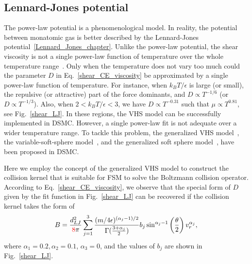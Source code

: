 \subsection{Lennard-Jones potential}



The power-law potential is a phenomenological model. In reality, the potential between monatomic gas is better described by the Lennard-Jones potential~\eqref{Lennard_Jones_chapter}. 
Unlike the power-law potential, the shear viscosity is not a single power-law function of temperature over the whole temperature range~\cite{CE}. Only when the temperature does not vary too much could the parameter $D$ in Eq.~\eqref{shear_CE_viscosity} be approximated by a single power-law function of temperature. For instance, when $k_BT/\epsilon$ is large (or small), the repulsive (or attractive) part of the force dominants, and $D\propto{T}^{-1/6}$ (or $D\propto{T}^{-1/3}$). Also, when $2<k_BT/\epsilon<3$, we have $D\propto{T}^{-0.31}$ such that $\mu\propto{T}^{0.81}$, see Fig.~\ref{shear_LJ}. In these regions, the VHS model can be successfully implemented in DSMC. However, a single power-law fit is not adequate over a wider temperature range. To tackle this problem, the generalized VHS model~\cite{Hassan1993}, the variable-soft-sphere model~\cite{Matsumoto2002}, and the generalized soft sphere model~\cite{Fan2002}, have been proposed in DSMC.

Here we employ the concept of the generalized VHS model to construct the collision kernel that is suitable for FSM to solve the Boltzmann collision operator. According to Eq.~\eqref{shear_CE_viscosity}, we observe that the special form of $D$ given by the fit function in Fig.~\ref{shear_LJ} can be recovered if the collision kernel takes the form of
\begin{equation}\label{kernel_spectral}
B=\frac{d_{LJ}^2}{\leir{8}\pi}\sum_{j=1}^3 \frac{({m}/{4\epsilon})^{(\alpha_j-1)/2}}{\Gamma(\frac{3+\alpha_j}{2})}b_j
\sin^{\alpha_j-1}\left(\frac{\theta}{2}\right)v_r^{\alpha_j},
\end{equation}
where $\alpha_1=0.2, \alpha_2=0.1$, $\alpha_3=0$, and the values of $b_j$ are shown in Fig.~\ref{shear_LJ}.

